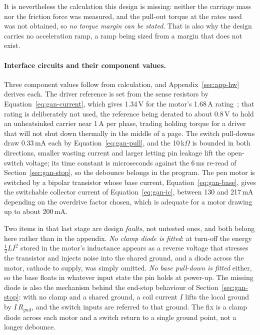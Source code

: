 It is nevertheless the calculation this design is missing: neither the carriage mass nor the friction force was measured, and the pull-out torque at the rates used~\cite{acarnley2002,stepperds} was not obtained, so \emph{no torque margin can be stated}.
That is also why the design carries no acceleration ramp, a ramp being sized from a margin that does not exist.

\paragraph{Interface circuits and their component values.}
\label{sec:gan-driver}
\label{sec:gan-switch}
\label{sec:gan-penckt}
Three component values follow from calculation, and Appendix~\ref{sec:app-hw} derives each.
The driver reference is set from the sense resistors by Equation~\ref{eq:gan-current}, which gives 1.34\,V for the motor's 1.68\,A rating~\cite{stepperds}; that rating is deliberately not used, the reference being derated to about 0.8\,V to hold an unheatsinked carrier near 1\,A per phase, trading holding torque for a driver that will not shut down thermally in the middle of a page.
The switch pull-downs draw 0.33\,mA each by Equation~\ref{eq:gan-pull}, and the 10\,k$\Omega$ is bounded in both directions, smaller wasting current and larger letting pin leakage lift the open-switch voltage; its time constant is microseconds against the 6\,ms re-read of Section~\ref{sec:gan-stop}, so the debounce belongs in the program.
The pen motor is switched by a bipolar transistor whose base current, Equation~\ref{eq:gan-base}, gives the switchable collector current of Equation~\ref{eq:gan-ic}, between 130 and 217\,mA depending on the overdrive factor chosen, which is adequate for a motor drawing up to about 200\,mA.

Two items in that last stage are design \emph{faults}, not untested ones, and both belong here rather than in the appendix.
\emph{No clamp diode is fitted}: at turn-off the energy $\tfrac12LI^2$ stored in the motor's inductance appears as a reverse voltage that stresses the transistor and injects noise into the shared ground, and a diode across the motor, cathode to supply, was simply omitted.
\emph{No base pull-down is fitted} either, so the base floats in whatever input state the pin holds at power-up.
The missing diode is also the mechanism behind the end-stop behaviour of Section~\ref{sec:gan-stop}: with no clamp and a shared ground, a coil current $I$ lifts the local ground by $I\,R_{gnd}$, and the switch inputs are referred to that ground.
The fix is a clamp diode across each motor and a switch return to a single ground point, not a longer debounce.

